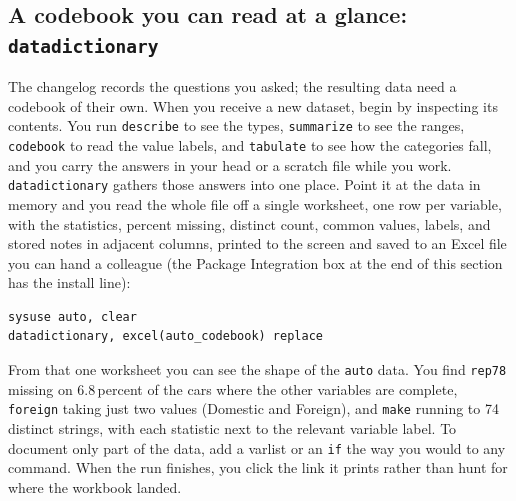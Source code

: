 \subsection{A codebook you can read at a glance: \texttt{datadictionary}}\label{sec:datadictionary}
The changelog records the questions you asked; the resulting data need a codebook of their own. When you receive a new dataset, begin by inspecting its contents. You run \texttt{describe} to see the types, \texttt{summarize} to see the ranges, \texttt{codebook} to read the value labels, and \texttt{tabulate} to see how the categories fall, and you carry the answers in your head or a scratch file while you work. \texttt{datadictionary} gathers those answers into one place. Point it at the data in memory and you read the whole file off a single worksheet, one row per variable, with the statistics, percent missing, distinct count, common values, labels, and stored notes in adjacent columns, printed to the screen and saved to an Excel file you can hand a colleague (the Package Integration box at the end of this section has the install line):
\par
{\footnotesize
\begin{verbatim}
sysuse auto, clear
datadictionary, excel(auto_codebook) replace
\end{verbatim}
}
From that one worksheet you can see the shape of the \texttt{auto} data. You find \texttt{rep78} missing on 6.8\,percent of the cars where the other variables are complete, \texttt{foreign} taking just two values (Domestic and Foreign), and \texttt{make} running to 74 distinct strings, with each statistic next to the relevant variable label. To document only part of the data, add a varlist or an \texttt{if} the way you would to any command. When the run finishes, you click the link it prints rather than hunt for where the workbook landed.

